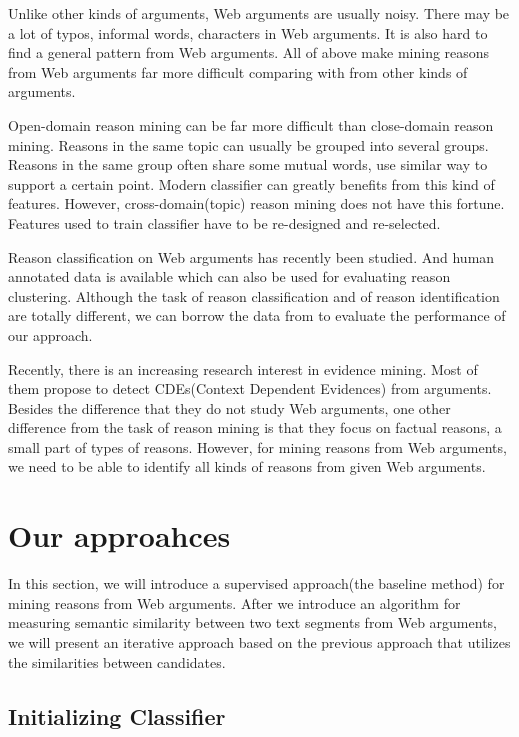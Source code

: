 \documentclass[11pt,a4paper]{article}
\begin{document}
Unlike other kinds of arguments, Web arguments are usually noisy\cite{habernal2016argument}. There may be a lot of typos, informal words, characters in Web arguments. It is also hard to find a general pattern from Web arguments. All of above make mining reasons from Web arguments far more difficult comparing with from other kinds of arguments.

Open-domain reason mining can be far more difficult than close-domain reason mining. Reasons in the same topic can usually be grouped into several groups\cite{hasan2014you}. Reasons in the same group often share some mutual words, use similar way to support a certain point. Modern classifier can greatly benefits from this kind of features. However, cross-domain(topic) reason mining does not have this fortune. Features used to train classifier have to be re-designed and re-selected. 

Reason classification on Web arguments has recently been studied\cite{hasan2014you}. And human annotated data is available which can also be used for evaluating reason clustering. Although the task of reason classification and of reason identification are totally different, we can borrow the data from \cite{hasan2014you} to evaluate the performance of our approach. 

Recently, there is an increasing research interest in evidence mining\cite{cartright2011evidence, rinott2015show, aharoni2014benchmark}. Most of them propose to detect CDEs(Context Dependent Evidences) from arguments. Besides the difference that they do not study Web arguments, one other difference from the task of reason mining is that they focus on factual reasons, a small part of types of reasons. However, for mining reasons from Web arguments, we need to be able to identify all kinds of reasons from given Web arguments.  

\section{Our approahces}
\label{sec:approach}

In this section, we will introduce a supervised approach(the baseline method) for mining reasons from Web arguments. After we introduce an algorithm for measuring semantic similarity between two text segments from Web arguments, we will present an iterative approach based on the previous approach that utilizes the similarities between candidates. 

\subsection{Initializing Classifier}
\end{document}
